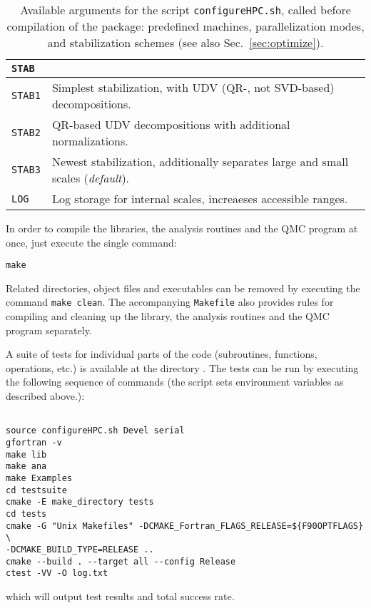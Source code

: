 \begin{table}[h]
\begin{center}
\begin{tabular}{@{} l l @{}}
			\textbf{\texttt{STAB}} &  \\\midrule
			\texttt{STAB1}  &  Simplest stabilization, with UDV (QR-, not SVD-based) decompositions.\\
			\texttt{STAB2}  &  QR-based UDV decompositions with additional normalizations.\\
			\texttt{STAB3}  &  Newest stabilization, additionally separates large and small scales (\emph{default}).\\
			\texttt{LOG}  &  Log storage for internal scales, increaeses accessible ranges.\\\bottomrule
		\end{tabular}
		\caption{Available arguments for the script \texttt{configureHPC.sh}, called before compilation of the package: predefined machines, parallelization modes, and stabilization schemes (see also Sec.~\ref{sec:optimize}).} \label{table:configureHPC}
	\end{center}
\end{table}

In order to compile the libraries, the analysis routines and the QMC program at once, just execute the single command:%
\begin{lstlisting}[style=bash,morekeywords={make}]
make
\end{lstlisting}
Related directories, object files and executables can be removed by executing the command \lstinline[style=bash,morekeywords={make}]{make clean}. The accompanying \texttt{Makefile} also provides rules for compiling and cleaning up the library, the analysis routines and the QMC program separately.  

A suite of tests for individual parts of the code (subroutines, functions, operations, etc.) is available at the directory . The tests can be run by executing the following sequence of commands (the script  sets environment variables as described above.):
\begin{lstlisting}[style=bash,morekeywords={make,cmake,ctest}]

source configureHPC.sh Devel serial
gfortran -v
make lib
make ana
make Examples
cd testsuite
cmake -E make_directory tests
cd tests
cmake -G "Unix Makefiles" -DCMAKE_Fortran_FLAGS_RELEASE=${F90OPTFLAGS} \
-DCMAKE_BUILD_TYPE=RELEASE ..
cmake --build . --target all --config Release
ctest -VV -O log.txt
\end{lstlisting}
which will output test results and total success rate.


